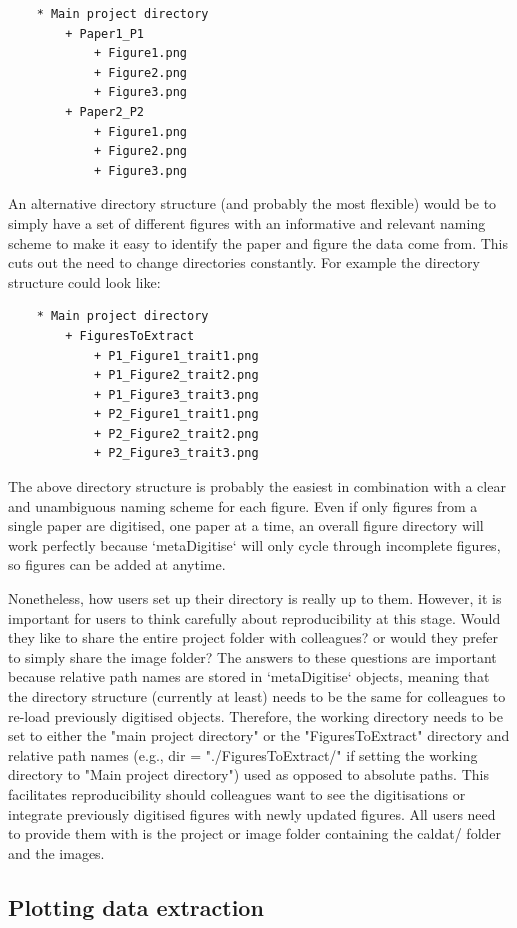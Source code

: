\documentclass{article}
\begin{document}
\begin{lstlisting}
	* Main project directory
		+ Paper1_P1
			+ Figure1.png
			+ Figure2.png
			+ Figure3.png
		+ Paper2_P2
			+ Figure1.png
			+ Figure2.png
			+ Figure3.png
\end{lstlisting}

An alternative directory structure (and probably the most flexible) would be to simply have a set of different figures with an informative and relevant naming scheme to make it easy to identify the paper and figure the data come from. This cuts out the need to change directories constantly. For example the directory structure could look like:

\begin{lstlisting}
	* Main project directory
		+ FiguresToExtract
			+ P1_Figure1_trait1.png
			+ P1_Figure2_trait2.png
			+ P1_Figure3_trait3.png
			+ P2_Figure1_trait1.png
			+ P2_Figure2_trait2.png
			+ P2_Figure3_trait3.png
\end{lstlisting}

The above directory structure is probably the easiest in combination with a clear and unambiguous naming scheme for each figure. Even if only figures from a single paper are digitised, one paper at a time, an overall figure directory will work perfectly because `metaDigitise` will only cycle through incomplete figures, so figures can be added at anytime. 

Nonetheless, how users set up their directory is really up to them. However, it is important for users to think carefully about reproducibility at this stage. Would they like to share the entire project folder with colleagues? or would they prefer to simply share the image folder? The answers to these questions are important because relative path names are stored in `metaDigitise` objects, meaning that the directory structure (currently at least) needs to be the same for colleagues to re-load previously digitised objects. Therefore, the working directory needs to be set to either the "main project directory" or the "FiguresToExtract" directory and relative path names (e.g., dir = "./FiguresToExtract/" if setting the working directory to "Main project directory") used as opposed to absolute paths. This facilitates reproducibility should colleagues want to see the digitisations or integrate previously digitised figures with newly updated figures. All users need to provide them with is the project or image folder containing the caldat/ folder and the images.

\subsection{Plotting data extraction}
\end{document}
